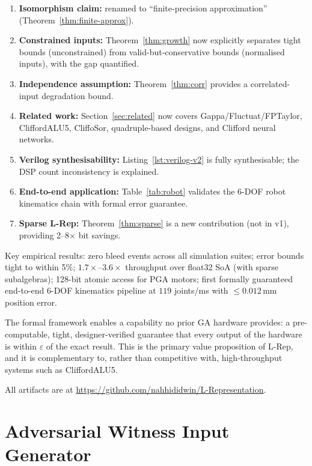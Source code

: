 \documentclass[11pt,a4paper]{article}
\theoremstyle{definition}
\theoremstyle{plain}
\theoremstyle{remark}
\begin{document}
\begin{enumerate}
  \item \textbf{Isomorphism claim:} renamed to ``finite-precision approximation''
        (Theorem~\ref{thm:finite-approx}).
  \item \textbf{Constrained inputs:} Theorem~\ref{thm:growth} now
        explicitly separates tight bounds (unconstrained) from valid-but-conservative
        bounds (normalised inputs), with the gap quantified.
  \item \textbf{Independence assumption:} Theorem~\ref{thm:corr} provides
        a correlated-input degradation bound.
  \item \textbf{Related work:} Section~\ref{sec:related} now covers
        Gappa/Fluctuat/FPTaylor, CliffordALU5, CliffoSor, quadruple-based
        designs, and Clifford neural networks.
  \item \textbf{Verilog synthesisability:} Listing~\ref{lst:verilog-v2}
        is fully synthesisable; the DSP count inconsistency is explained.
  \item \textbf{End-to-end application:} Table~\ref{tab:robot} validates
        the 6-DOF robot kinematics chain with formal error guarantee.
  \item \textbf{Sparse L-Rep:} Theorem~\ref{thm:sparse} is a new
        contribution (not in v1), providing 2--8$\times$ bit savings.
\end{enumerate}

Key empirical results: zero bleed events across all simulation suites;
error bounds tight to within 5\%; $1.7\times$--$3.6\times$ throughput
over float32 SoA (with sparse subalgebras); 128-bit atomic access for
PGA motors; first formally guaranteed end-to-end 6-DOF kinematics
pipeline at $119$ joints/ms with $\le 0.012\,\text{mm}$ position error.

The formal framework enables a capability no prior GA hardware provides:
a pre-computable, tight, designer-verified guarantee that every output
of the hardware is within $\varepsilon$ of the exact result.
This is the primary value proposition of L-Rep, and it is
complementary to, rather than competitive with, high-throughput systems
such as CliffordALU5.

All artifacts are at \url{https://github.com/nahhididwin/L-Representation}.

\appendix

\section{Adversarial Witness Input Generator}
\label{app:proof}
\end{document}

